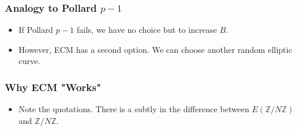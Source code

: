 \documentclass{beamer}
\begin{document}
\begin{frame}
\frametitle{Analogy to Pollard $p-1$}
\begin{table}[h!]
  \begin{center}
    \label{tab:table1}
  \end{center}
\end{table}

\begin{itemize}
\item<7-> If Pollard $p-1$ fails, we have no choice but to increase $B$.
\item<8-> However, ECM has a second option. We can choose another random elliptic curve.
\end{itemize}
\end{frame}


\begin{frame}
\frametitle{Why ECM "Works"}


\begin{itemize}
\item<3-> Note the quotations. There is a subtly in the difference between $E(/N)$ and $/N$.
\end{itemize}
\end{frame}
\end{document}
